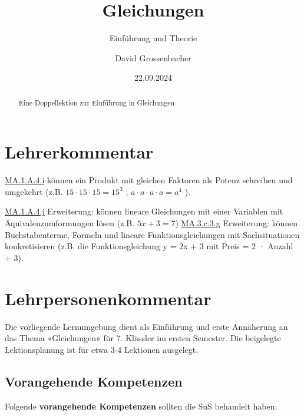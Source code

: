 \documentclass[
  10pt,
  a4paper,
  DIV=11]{scrartcl}
\title{Gleichungen}
\subtitle{Einführung und Theorie}
\author{David Grossenbacher}
\date{22.09.2024}
\renewcommand*\contentsname{Inhaltsverzeichnis}
\newcommand\contentsname{Inhaltsverzeichnis}
\begin{document}
\maketitle
\begin{abstract}
Eine Doppellektion zur Einführung in Gleichungen
\end{abstract}

\renewcommand*\contentsname{Inhaltsverzeichnis}
{
\hypersetup{linkcolor=}
\setcounter{tocdepth}{3}
\tableofcontents
}

\section{}\label{section}

\section{Lehrerkommentar}\label{lehrerkommentar}

\href{https://be.lehrplan.ch/101E8xmhHHgram3LHqgCx2Gwdg3vJ6cPY}{MA.1.A.4.i}
können ein Produkt mit gleichen Faktoren als Potenz schreiben und
umgekehrt (z.B. \(15 \cdot 15 \cdot 15 = 15^3\) ;
\(a \cdot a \cdot a \cdot a = a^4\) ).

\href{https://be.lehrplan.ch/101AJt2yMqVxRygKJ2xZqrbaqzAhfYnDL}{MA.1.A.4.j}
Erweiterung: können lineare Gleichungen mit einer Variablen mit
Äquivalenzumformungen lösen (z.B. \(5x + 3 = 7\))
\href{https://be.lehrplan.ch/101eyUHN5UTpNM7eNmb25PVMKdrYH99AJ}{MA.3.c.3.g}
Erweiterung: können Buchstabenterme, Formeln und lineare
Funktionsgleichungen mit Sachsituationen konkretisieren (z.B. die
Funktionsgleichung y = 2x + 3 mit Preis = 2 · Anzahl + 3).

\section{Lehrpersonenkommentar}\label{lehrpersonenkommentar}

Die vorliegende Lernumgebung dient als Einführung und erste Annäherung
an das Thema «Gleichungen» für 7. Klässler im ersten Semester. Die
beigelegte Lektionsplanung ist für etwa 3-4 Lektionen ausgelegt.

\subsection{Vorangehende Kompetenzen}\label{vorangehende-kompetenzen}

Folgende \textbf{vorangehende Kompetenzen} sollten die SuS behandelt
haben:
\end{document}
